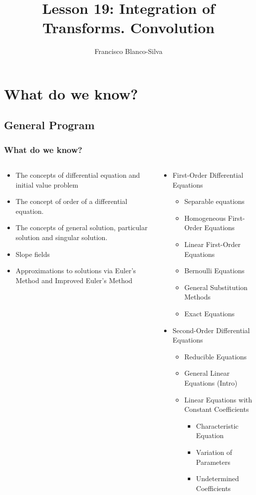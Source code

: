 \documentclass[9pt,xcolor=x11names,compress]{beamer}
\author[Francisco Blanco-Silva]{Francisco Blanco-Silva}
\institute[USC]{University of South Carolina}
\date{
\pgfdeclarelindenmayersystem{levyCurve}{
	\rule{F -> F+F+}
}
\begin{tikzpicture}[color=DeepSkyBlue4,rotate=90]
    \draw [l-system={levyCurve, axiom=F, order=12, step=1pt, angle=90 }]
    lindenmayer system; 
	\end{tikzpicture}		
}
\title{Lesson 19: Integration of Transforms. Convolution}
\begin{document}
\frame{\titlepage}

\section{What do we know?}
\subsection{General Program}

\begin{frame}\frametitle{What do we know?}
\begin{columns}[T]
\begin{column}{0.45\linewidth}
\begin{itemize}
\item The concepts of \alert{differential equation} and \alert{initial value problem}
\item The concept of \alert{order} of a differential equation.
\item The concepts of \alert{general solution}, \alert{particular solution} and \alert{singular solution}.
\item \alert{Slope fields}
\item Approximations to solutions via \alert{Euler's Method} and \alert{Improved Euler's Method}
\end{itemize} 
\end{column}
\begin{column}{0.55\linewidth}
\begin{itemize}
\item First-Order Differential Equations
\begin{itemize}
\item Separable equations 
\item Homogeneous First-Order Equations 
\item Linear First-Order Equations 
\item Bernoulli Equations 
\item General Substitution Methods
\item Exact Equations 
\end{itemize}
\item Second-Order Differential Equations
\begin{itemize}
	\item Reducible Equations
	\item General Linear Equations (Intro)
	\item Linear Equations with Constant Coefficients
	\begin{itemize}
		\item Characteristic Equation
		\item Variation of Parameters
		\item Undetermined Coefficients
	\end{itemize}
\end{itemize}
\end{itemize}
\end{column}
\end{columns}
\end{frame}
\end{document}
